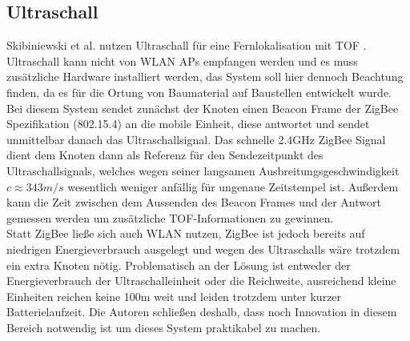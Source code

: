 \subsection{Ultraschall}
Skibiniewski et al. nutzen Ultraschall für eine Fernlokalisation mit TOF \cite{skibniewski2009simulation}.
Ultraschall kann nicht von WLAN APs empfangen werden und es muss zusätzliche Hardware installiert werden, das System soll hier dennoch Beachtung finden, da es für die Ortung von Baumaterial auf Baustellen entwickelt wurde.\\
Bei diesem System sendet zunächst der Knoten einen Beacon Frame der ZigBee Spezifikation (802.15.4) an die mobile Einheit, diese antwortet und sendet unmittelbar danach das Ultraschallsignal.
Das schnelle 2.4GHz ZigBee Signal dient dem Knoten dann als Referenz für den Sendezeitpunkt des Ultraschallsignals, welches wegen seiner langsamen Ausbreitungsgeschwindigkeit $c \approx 343m/s$ wesentlich weniger anfällig für ungenaue Zeitstempel ist. 
Außerdem kann die Zeit zwischen dem Aussenden des Beacon Frames und der Antwort gemessen werden um zusätzliche TOF-Informationen zu gewinnen. \\
Statt ZigBee ließe sich auch WLAN nutzen, ZigBee ist jedoch bereits auf niedrigen Energieverbrauch ausgelegt und wegen des Ultraschalls wäre trotzdem ein extra Knoten nötig.
Problematisch an der Lösung ist entweder der Energieverbrauch der Ultraschalleinheit oder die Reichweite, ausreichend kleine Einheiten reichen keine 100m weit und leiden trotzdem unter kurzer Batterielaufzeit.
Die Autoren schließen deshalb, dass noch Innovation in diesem Bereich notwendig ist um dieses System praktikabel zu machen.

